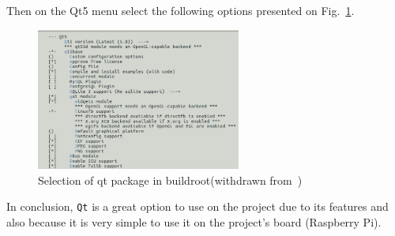 Then on the Qt5 menu select the following options presented on Fig.~\ref{fig:qt-buildroot}.
%
\begin{figure}[!hbt]
\centering
    \includegraphics[width=0.6\textwidth]{./img/qt-buildroot.png}
  \caption{Selection of qt package in buildroot(withdrawn from~\cite{qt-root})}%
\label{fig:qt-buildroot}
\end{figure}

In conclusion, \texttt{Qt} is a great option to use on the project due to its features and also because it is very simple to use it on the project's board (Raspberry Pi).
